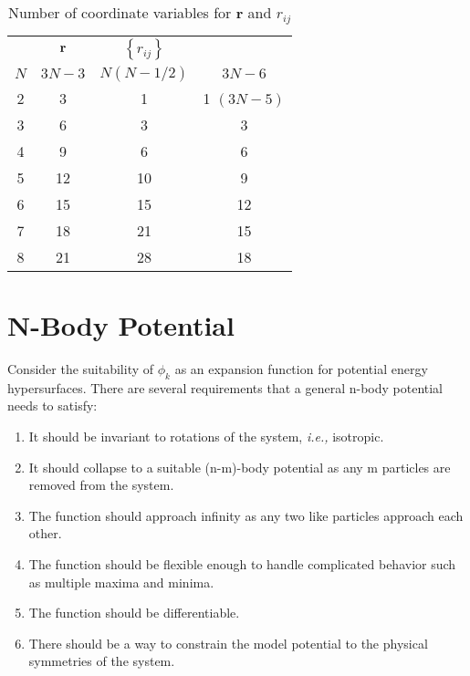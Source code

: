 \begin{table}[tbp] \centering%
\begin{tabular}{cccc}
\hline\hline
& ${\bf r}$ & $\left\{ r_{ij}\right\} $ &  \\ 
$N$ & $3N-3$ & $N\left( N-1/2\right) $ & $3N-6$ \\ \hline
2 & 3 & 1 & 1$\,\,(3N-5)$ \\ 
3 & 6 & 3 & 3 \\ 
4 & 9 & 6 & 6 \\ 
5 & 12 & 10 & 9 \\ 
6 & 15 & 15 & 12 \\ 
7 & 18 & 21 & 15 \\ 
8 & 21 & 28 & 18 \\ \hline
\end{tabular}
\caption{Number of coordinate variables for {\bf{r}} and $ r_{ij} $
\label{Ntab}}%
\end{table}%

\section{N-Body Potential}

Consider the suitability of $\phi _k$ as an expansion function for potential
energy hypersurfaces. There are several requirements that a general n-body
potential needs to satisfy:

\begin{enumerate}
\item  It should be invariant to rotations of the system, {\it i.e.,}
isotropic.

\item  It should collapse to a suitable (n-m)-body potential as any m
particles are removed from the system.

\item  The function should approach infinity as any two like particles
approach each other.

\item  The function should be flexible enough to handle complicated behavior
such as multiple maxima and minima.

\item  The function should be differentiable.

\item  There should be a way to constrain the model potential to the
physical symmetries of the system.
\end{enumerate}

